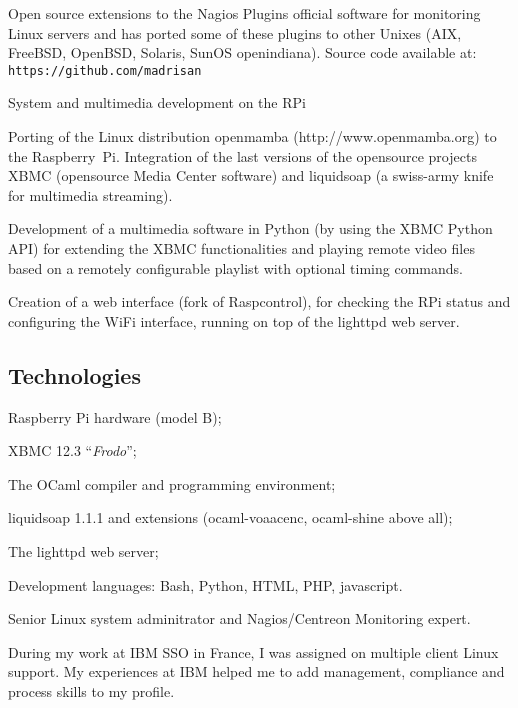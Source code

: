 \noindent
Open source extensions to the 
Nagios Plugins official software for monitoring Linux servers and has ported
some of these plugins to other Unixes (AIX, FreeBSD, OpenBSD, Solaris, 
SunOS openindiana).
Source code available at: {\tt https://github.com/madrisan}


\bigskip
{}
   {System and multimedia development on the RPi}

\noindent
Porting of the Linux distribution openmamba 
({\rm http:/\negthinspace/www.openmamba.org}) to the Raspberry~Pi.
Integration of the last versions of the opensource projects XBMC 
(opensource Media Center software) and liquidsoap 
(a swiss-army knife for multimedia streaming).

Development of a multimedia software in Python (by using the XBMC Python API)
for extending the XBMC functionalities and playing remote video files based on
a remotely configurable playlist with optional timing commands.

Creation of a web interface (fork of Raspcontrol), for checking the RPi status
and configuring the WiFi interface, running on top of the lighttpd web server.

\subsection{Technologies}

\item{\bdot} Raspberry Pi hardware (model B);
\item{\bdot} XBMC 12.3 ``{\it Frodo\/}'';
\item{\bdot} The OCaml compiler and programming environment;
\item{\bdot} liquidsoap 1.1.1 and extensions (ocaml-voaacenc, ocaml-shine above all);
\item{\bdot} The lighttpd web server;
\item{\bdot} Development languages: Bash, Python, HTML, PHP, javascript.


\bigskip
{}

\noindent
Senior Linux system adminitrator and Nagios/Centreon Monitoring expert.

During my work at IBM SSO in France, I was assigned on multiple client Linux support.
My experiences at IBM helped me to add management, compliance and process skills 
to my profile. 

